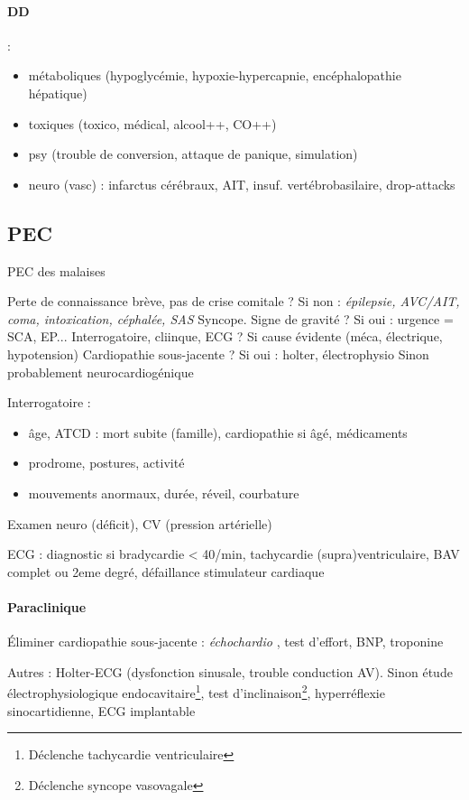 \documentclass{article}
\begin{document}
\paragraph{DD} : 
\begin{itemize}
  \item métaboliques (hypoglycémie, hypoxie-hypercapnie,
encéphalopathie hépatique)
\item toxiques (toxico, médical, alcool++, CO++)
\item psy (trouble de conversion, attaque de panique, simulation)
\item neuro (vasc) : infarctus cérébraux, AIT, insuf. vertébrobasilaire,
  drop-attacks
\end{itemize}

\subsection{PEC}
\begin{algorithm}
  \caption{PEC des malaises}
   Perte de connaissance brève, pas de crise comitale ? Si non : \textit{épilepsie,
    AVC/AIT, coma, intoxication, céphalée, SAS} \faHandStopO\;
   Syncope. Signe de gravité ? Si oui : urgence = SCA, EP... \faHandStopO\;
   Interrogatoire, cliinque, ECG ? Si cause évidente (méca, électrique,
    hypotension) \faHandStopO\;
   Cardiopathie sous-jacente ? Si oui : holter, électrophysio\;
   Sinon probablement neurocardiogénique
\end{algorithm}

Interrogatoire :
\begin{itemize}
  \item âge, ATCD : mort subite (famille), cardiopathie si âgé, médicaments
  \item prodrome, postures, activité
  \item mouvements anormaux, durée, réveil, courbature
\end{itemize}
Examen neuro (déficit), CV (pression artérielle)

ECG : diagnostic si bradycardie < 40/min, tachycardie (supra)ventriculaire, BAV
complet ou 2eme degré, défaillance stimulateur cardiaque

\paragraph{Paraclinique}
Éliminer cardiopathie sous-jacente : \textit{échochardio} , test d'effort, BNP,
troponine

Autres : Holter-ECG (dysfonction sinusale, trouble conduction AV). Sinon
étude électrophysiologique endocavitaire\footnote{Déclenche tachycardie
ventriculaire}, test d'inclinaison\footnote{Déclenche syncope vasovagale},
hyperréflexie sinocartidienne, ECG implantable
\end{document}

